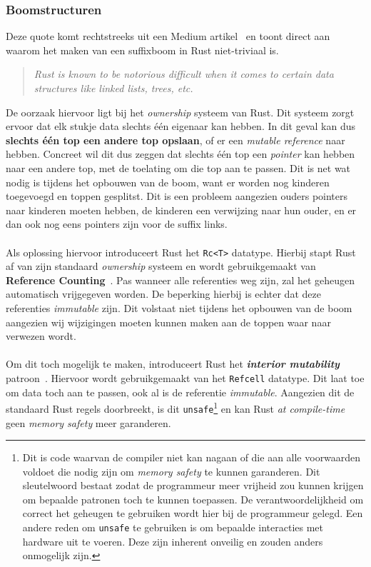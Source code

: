 \subsubsection{Boomstructuren}
Deze quote komt rechtstreeks uit een Medium artikel~\cite{rust_difficulty_quote} en toont direct aan waarom het maken van een suffixboom in Rust niet-triviaal is.
\begin{quote}
    \textit{Rust is known to be notorious difficult when it comes to certain data structures like linked lists, trees, etc.}
\end{quote}
De oorzaak hiervoor ligt bij het \textit{ownership} systeem van Rust.
Dit systeem zorgt ervoor dat elk stukje data slechts één eigenaar kan hebben.
In dit geval kan dus \textbf{slechts één top een andere top opslaan}, of er een \textit{mutable reference} naar hebben.
Concreet wil dit dus zeggen dat slechts één top een \textit{pointer} kan hebben naar een andere top, met de toelating om die top aan te passen.
Dit is net wat nodig is tijdens het opbouwen van de boom, want er worden nog kinderen toegevoegd en toppen gesplitst.
Dit is een probleem aangezien ouders pointers naar kinderen moeten hebben, de kinderen een verwijzing naar hun ouder, en er dan ook nog eens pointers zijn voor de suffix links.
\\ \\
Als oplossing hiervoor introduceert Rust het \texttt{Rc<T>} datatype.
Hierbij stapt Rust af van zijn standaard \textit{ownership} systeem en wordt gebruikgemaakt van \textbf{Reference Counting}~\cite{reference_counting}.
Pas wanneer alle referenties weg zijn, zal het geheugen automatisch vrijgegeven worden.
De beperking hierbij is echter dat deze referenties \textit{immutable} zijn.
Dit volstaat niet tijdens het opbouwen van de boom aangezien wij wijzigingen moeten kunnen maken aan de toppen waar naar verwezen wordt.
\\ \\
Om dit toch mogelijk te maken, introduceert Rust het \textbf{\textit{interior mutability}} patroon~\cite{interior_mutability}.
Hiervoor wordt gebruikgemaakt van het \texttt{Refcell} datatype.
Dit laat toe om data toch aan te passen, ook al is de referentie \textit{immutable}.
Aangezien dit de standaard Rust regels doorbreekt, is dit \texttt{unsafe}\footnote{Dit is code waarvan de compiler niet kan nagaan of die aan alle voorwaarden voldoet die nodig zijn om \textit{memory safety} te kunnen garanderen. Dit sleutelwoord bestaat zodat de programmeur meer vrijheid zou kunnen krijgen om bepaalde patronen toch te kunnen toepassen. De verantwoordelijkheid om correct het geheugen te gebruiken wordt hier bij de programmeur gelegd. Een andere reden om \texttt{unsafe} te gebruiken is om bepaalde interacties met hardware uit te voeren. Deze zijn inherent onveilig en zouden anders onmogelijk zijn.} en kan Rust \textit{at compile-time} geen \textit{memory safety} meer garanderen.
